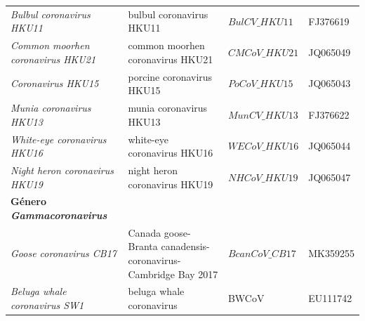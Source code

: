 \begin{table}[H]
\begin{tabularx}{\textwidth}{@{}>{\raggedright\arraybackslash}p{4cm}>{\raggedright\arraybackslash}p{4.5cm}>{\raggedright\arraybackslash}p{3cm}>{\raggedright\arraybackslash}X@{}}
    \textit{Bulbul coronavirus HKU11}                               & bulbul coronavirus HKU11                             & $BulCV\_{HKU11}$                              &  FJ376619             \\
    \textit{Common moorhen coronavirus HKU21}                       & common moorhen coronavirus HKU21                     & $CMCoV\_{HKU21}$                              &  JQ065049             \\
    \textit{Coronavirus HKU15}                                      & porcine coronavirus HKU15                            & $PoCoV\_{HKU15}$                              &  JQ065043             \\
    \textit{Munia coronavirus HKU13}                                & munia coronavirus HKU13                              & $MunCV\_{HKU13}$                              &  FJ376622             \\
    \textit{White-eye coronavirus HKU16}                            & white-eye coronavirus HKU16                          & $WECoV\_{HKU16}$                              &  JQ065044             \\
    \textit{Night heron coronavirus HKU19}                          & night heron coronavirus HKU19                        & $NHCoV\_{HKU19}$                              &  JQ065047             \\ \midrule
    \textbf{Género \textit{Gammacoronavirus}}                                                                                                                                                      \\ \midrule
    \textit{Goose coronavirus CB17}                                 & Canada goose-Branta canadensis-coronavirus-Cambridge Bay 2017 & $BcanCoV\_{CB17}$                    &  MK359255             \\ 
    \textit{Beluga whale coronavirus SW1}                           & beluga whale coronavirus                             & BWCoV                                         &  EU111742             \\
    \end{tabularx}
\end{table}

